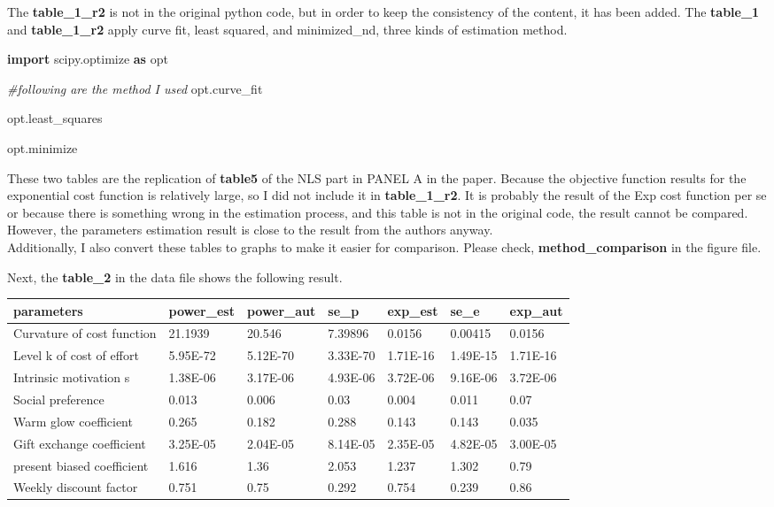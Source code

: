\documentclass[11pt
]{article}
\newenvironment{Shaded}{}{}
\newcommand{\CommentTok}[1]{\textcolor[rgb]{0.38,0.63,0.69}{\textit{#1}}}
\newcommand{\ImportTok}[1]{\textcolor[rgb]{0.00,0.50,0.00}{\textbf{#1}}}
\newcommand{\NormalTok}[1]{#1}
\begin{document}
The \textbf{table\_1\_r2} is not in the original python code, but in
order to keep the consistency of the content, it has been added. The
\textbf{table\_1} and \textbf{table\_1\_r2} apply curve fit, least
squared, and minimized\_nd, three kinds of estimation method.

\begin{Shaded}
\begin{Highlighting}[]
\ImportTok{import}\NormalTok{ scipy.optimize }\ImportTok{as}\NormalTok{ opt
}
\CommentTok{\#following are the method I used
}
\NormalTok{opt.curve\_fit
}
\NormalTok{opt.least\_squares
}
\NormalTok{opt.minimize}
\end{Highlighting}
\end{Shaded}

These two tables are the replication of \textbf{table5 }of the NLS part in
PANEL A in the paper. Because the objective function results for the exponential
cost function is relatively large, so I did not include it in
\textbf{table\_1\_r2}. It is probably the result of the Exp cost function
per se or because there is something wrong in the estimation process,
and this table is not in the original code, the result cannot be
compared. However, the parameters estimation result is close to the
result from the authors anyway.\\
Additionally, I also convert these tables to graphs to make it
easier for comparison. Please check, \textbf{method\_comparison} in the
figure file.

Next, the \textbf{table\_2} in the data file shows the following result.

\begin{longtable}[]{@{}lllllll@{}}
\toprule()
parameters & power\_est & power\_aut & se\_p & exp\_est & se\_e &
exp\_aut \\
\midrule()
\endhead
Curvature of cost function & 21.1939 & 20.546 & 7.39896 & 0.0156 &
0.00415 & 0.0156 \\
Level k of cost of effort & 5.95E-72 & 5.12E-70 & 3.33E-70 & 1.71E-16 &
1.49E-15 & 1.71E-16 \\
Intrinsic motivation s & 1.38E-06 & 3.17E-06 & 4.93E-06 & 3.72E-06 &
9.16E-06 & 3.72E-06 \\
Social preference & 0.013 & 0.006 & 0.03 & 0.004 & 0.011 & 0.07 \\
Warm glow coefficient & 0.265 & 0.182 & 0.288 & 0.143 & 0.143 & 0.035 \\
Gift exchange coefficient & 3.25E-05 & 2.04E-05 & 8.14E-05 & 2.35E-05 &
4.82E-05 & 3.00E-05 \\
present biased coefficient & 1.616 & 1.36 & 2.053 & 1.237 & 1.302 &
0.79 \\
Weekly discount factor & 0.751 & 0.75 & 0.292 & 0.754 & 0.239 & 0.86 \\
\bottomrule()
\end{longtable}
\end{document}
